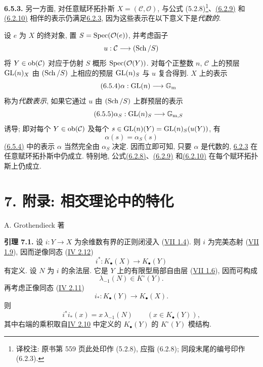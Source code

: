 \textbf{6.5.3.} 另一方面, 对任意赋环拓扑斯 $X=(\mathcal C,\mathcal O)$, 与公式 (5.2.8)\footnote{译校注: 原书第 559 页此处印作 (5.2.8), 应指 (6.2.8); 同段末尾的编号印作 (6.2.3).}、\hyperlink{sga6.e10.eq.6-2-9}{(6.2.9)} 和\hyperlink{sga6.e10.eq.6-2-10}{(6.2.10)} 相伴的表示仍满足\hyperlink{sga6.e10.cor.6-2-3}{6.2.3}, 因为这些表示在以下意义下是\emph{代数的}.
%
%
%
%

设 $e$ 为 $X$ 的终对象, 置 $S=\operatorname{Spec}(\mathcal O(e))$, 并考虑函子
%
\[
u:\mathcal C\longrightarrow(\operatorname{Sch}/S)
\]
将 $Y\in\operatorname{ob}(\mathcal C)$ 对应于仿射 $S$ 概形 $\operatorname{Spec}(\mathcal O(Y))$. 对每个正整数 $n$, $\mathcal C$ 上的预层 $\operatorname{GL}(n)_X$ 由 $(\operatorname{Sch}/S)$ 上相应的预层 $\operatorname{GL}(n)_S$ 与 $u$ 复合得到. $X$ 上的表示
%
%
%
\begin{equation}\tag{6.5.4}
\alpha:\operatorname{GL}(n)\longrightarrow\mathbb G_{\mathrm m}
\end{equation}
称为\emph{代数表示}, 如果它通过 $u$ 由 $(\operatorname{Sch}/S)$ 上群预层的表示
\begin{equation}\tag{6.5.5}
\alpha_S:\operatorname{GL}(n)_S\longrightarrow\mathbb G_{\mathrm m,S}
\end{equation}
诱导; 即对每个 $Y\in\operatorname{ob}(\mathcal C)$ 及每个 $s\in\operatorname{GL}(n)(Y)=\operatorname{GL}(n)_S(u(Y))$, 有
\[
\alpha(s)=\alpha_S(s)
\]
\hyperlink{sga6.e10.eq.6-5-4}{(6.5.4)} 中的表示 $\alpha$ 当然完全由 $\alpha_S$ 决定. 因而立即可知, 只要 $\alpha$ 是代数的, \hyperlink{sga6.e10.cor.6-2-3}{6.2.3} 在任意赋环拓扑斯中仍成立. 特别地, 公式\hyperlink{sga6.e10.eq.6-2-8}{(6.2.8)}、\hyperlink{sga6.e10.eq.6-2-9}{(6.2.9)} 和\hyperlink{sga6.e10.eq.6-2-10}{(6.2.10)} 在每个赋环拓扑斯上仍成立.
%
%
%
%
%

\section*{7. 附录: 相交理论中的特化}
\begin{center}
A. Grothendieck 著
\end{center}

\textbf{引理 7.1.} 设 $i:Y\to X$ 为余维数有界的正则闭浸入 (\hyperlink{sga6.e07.def.1-4}{VII 1.4}). 则 $i$ 为完美态射 (\hyperlink{sga6.e07.prop.1-9}{VII 1.9}), 因而逆像同态 (\hyperlink{sga6.e04.para.2-12}{IV 2.12})
%
%
%
\[
i^*:K_\bullet(X)\longrightarrow K_\bullet(Y)
\]
有定义. 设 $N$ 为 $i$ 的余法层. 它是 $Y$ 上的有限型局部自由层 (\hyperlink{sga6.e07.def.1-6}{VII 1.6}), 因而可构成
%
\[
\lambda_{-1}(N)\in K^\circ(Y).
\]
再考虑正像同态 (\hyperlink{sga6.e04.para.2-11}{IV 2.11})
\[
i_*:K_\bullet(Y)\longrightarrow K_\bullet(X).
\]
则
\[
i^*i_*(x)=x\,\lambda_{-1}(N)\qquad(x\in K_\bullet(Y)),
\]
其中右端的乘积取自\hyperlink{sga6.e04.para.2-10}{IV 2.10} 中定义的 $K_\bullet(Y)$ 的 $K^\circ(Y)$ 模结构.
%

